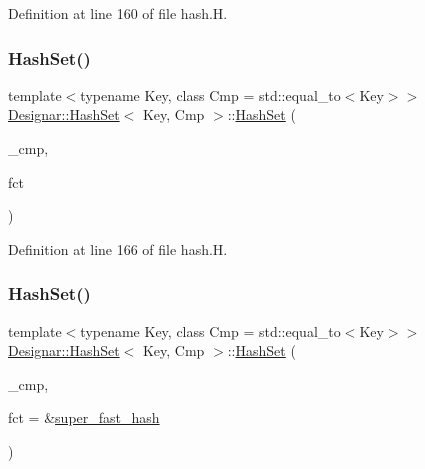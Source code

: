 Definition at line 160 of file hash.\+H.

\mbox{\label{class_designar_1_1_hash_set_aea364027e144f9a079ba56f1c0608c37}} 
\subsubsection{\texorpdfstring{Hash\+Set()}{HashSet()}\hspace{0.1cm}{\footnotesize\ttfamily [7/12]}}
{\footnotesize\ttfamily template$<$typename Key, class Cmp = std\+::equal\+\_\+to$<$\+Key$>$$>$ \\
\hyperlink{class_designar_1_1_hash_set}{Designar\+::\+Hash\+Set}$<$ Key, Cmp $>$\+::\hyperlink{class_designar_1_1_hash_set}{Hash\+Set} (\begin{DoxyParamCaption}\item[{Cmp \&\&}]{\+\_\+cmp,  }\item[{\hyperlink{class_designar_1_1_hash_set_a05d8d111665c25bc17290c01fa299398}{Hash\+Fct\+Type}}]{fct }\end{DoxyParamCaption})\hspace{0.3cm}{\ttfamily [inline]}}



Definition at line 166 of file hash.\+H.

\mbox{\label{class_designar_1_1_hash_set_a936fde31abdaab2deac50bfbe4d361a0}} 
\subsubsection{\texorpdfstring{Hash\+Set()}{HashSet()}\hspace{0.1cm}{\footnotesize\ttfamily [8/12]}}
{\footnotesize\ttfamily template$<$typename Key, class Cmp = std\+::equal\+\_\+to$<$\+Key$>$$>$ \\
\hyperlink{class_designar_1_1_hash_set}{Designar\+::\+Hash\+Set}$<$ Key, Cmp $>$\+::\hyperlink{class_designar_1_1_hash_set}{Hash\+Set} (\begin{DoxyParamCaption}\item[{Cmp \&}]{\+\_\+cmp,  }\item[{\hyperlink{class_designar_1_1_hash_set_a7a8b0a4970519ebc9ccc1ad247d0639f}{Hash\+Fct\+Ptr}}]{fct = {\ttfamily \&\hyperlink{namespace_designar_afd5712d16b3ae1c1c7d59f1004cd96fd}{super\+\_\+fast\+\_\+hash}} }\end{DoxyParamCaption})\hspace{0.3cm}{\ttfamily [inline]}}



